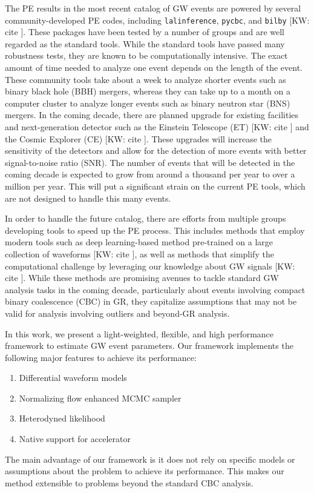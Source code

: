 \documentclass[twocolumn]{aastex631}
\newcommand{\kw}[1]{{\color{rb4}[KW: #1 ]}}
\begin{document}
The PE results in the most recent catalog of GW events are powered by several
community-developed PE codes, including \texttt{lalinference}, \texttt{pycbc},
and \texttt{bilby} \cite{Romero-Shaw:2020owr} \kw{cite}. These packages have
been tested by a number of groups and are well regarded as the standard tools.
While the standard tools have passed many robustness tests, they are known to be
computationally intensive. The exact amount of time needed to analyze one event
depends on the length of the event. These community tools take about a week to
analyze shorter events such as binary black hole (BBH) mergers, whereas they can
take up to a month on a computer cluster to analyze longer events such as binary
neutron star (BNS) mergers. In the coming decade, there are planned upgrade for
existing facilities and next-generation detector such as the Einstein Telescope
(ET) \kw{cite} and the Cosmic Explorer (CE) \kw{cite}. These upgrades will
increase the sensitivity of the detectors and allow for the detection of more
events with better signal-to-noise ratio (SNR). The number of events that will
be detected in the coming decade is expected to grow from around a thousand per
year to over a million per year. This will put a significant strain on the
current PE tools, which are not designed to handle this many events.

In order to handle the future catalog, there are efforts from multiple groups
developing tools to speed up the PE process. This includes methods that employ
modern tools such as deep learning-based method pre-trained on a large
collection of waveforms \kw{cite}, as well as methods that simplify the
computational challenge by leveraging our knowledge about GW signals \kw{cite}.
While these methods are promising avenues to tackle standard GW analysis tasks
in the coming decade, particularly about events involving compact binary coalescence
(CBC) in GR, they capitalize assumptions that may not be valid for analysis involving
outliers and beyond-GR analysis.


In this work, we present a light-weighted, flexible, and high performance
framework to estimate GW event parameters. Our framework implements the
following major features to achieve its performance:
\begin{enumerate}
\setlength{\itemsep}{0pt}
\item Differential waveform models
\item Normalizing flow enhanced MCMC sampler
\item Heterodyned likelihood
\item Native support for accelerator
\end{enumerate}
The main advantage of our framework is it does not rely on specific models or
assumptions about the problem to achieve its performance. This makes our method
extensible to problems beyond the standard CBC analysis. 
\end{document}

